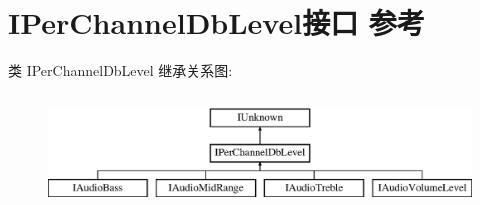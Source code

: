 \hypertarget{interface_i_per_channel_db_level}{}\section{I\+Per\+Channel\+Db\+Level接口 参考}
\label{interface_i_per_channel_db_level}
类 I\+Per\+Channel\+Db\+Level 继承关系图\+:\begin{figure}[H]
\begin{center}
\leavevmode
\includegraphics[height=3.000000cm]{interface_i_per_channel_db_level}
\end{center}
\end{figure}

